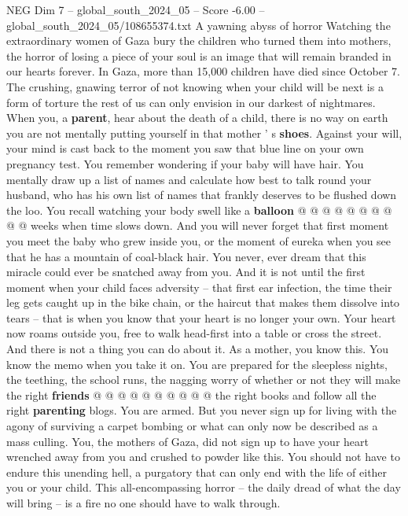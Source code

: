 \begin{textsample}{NEG Dim 7 – global\_south\_2024\_05 – Score -6.00 – global\_south\_2024\_05/108655374.txt}  \label{ex:f7_neg_383}
A yawning abyss of horror Watching the extraordinary women of Gaza bury the children who turned them into mothers, the horror of losing a piece of your soul is an image that will remain branded in our hearts forever.
In Gaza, more than 15,000 children have died since October 7.
The crushing, gnawing terror of not knowing when your child will be next is a form of torture the rest of us can only envision in our darkest of nightmares.
When you, a \textbf{parent}, hear about the death of a child, there is no way on earth you are not mentally putting yourself in that mother ' s \textbf{shoes}.
Against your will, your mind is cast back to the moment you saw that blue line on your own pregnancy test.
You remember wondering if your baby will have hair.
You mentally draw up a list of names and calculate how best to talk round your husband, who has his own list of names that frankly deserves to be flushed down the loo.
You recall watching your body swell like a \textbf{balloon} @ @ @ @ @ @ @ @ @ @ weeks when time slows down.
And you will never forget that first moment you meet the baby who grew inside you, or the moment of eureka when you see that he has a mountain of coal-black hair.
You never, ever dream that this miracle could ever be snatched away from you.
And it is not until the first moment when your child faces adversity -- that first ear infection, the time their leg gets caught up in the bike chain, or the haircut that makes them dissolve into tears -- that is when you know that your heart is no longer your own.
Your heart now roams outside you, free to walk head-first into a table or cross the street.
And there is not a thing you can do about it.
As a mother, you know this.
You know the memo when you take it on.
You are prepared for the sleepless nights, the teething, the school runs, the nagging worry of whether or not they will make the right \textbf{friends} @ @ @ @ @ @ @ @ @ @ the right books and follow all the right \textbf{parenting} blogs.
You are armed.
But you never sign up for living with the agony of surviving a carpet bombing or what can only now be described as a mass culling.
You, the mothers of Gaza, did not sign up to have your heart wrenched away from you and crushed to powder like this.
You should not have to endure this unending hell, a purgatory that can only end with the life of either you or your child.
This all-encompassing horror -- the daily dread of what the day will bring -- is a fire no one should have to walk through.

\end{textsample}
